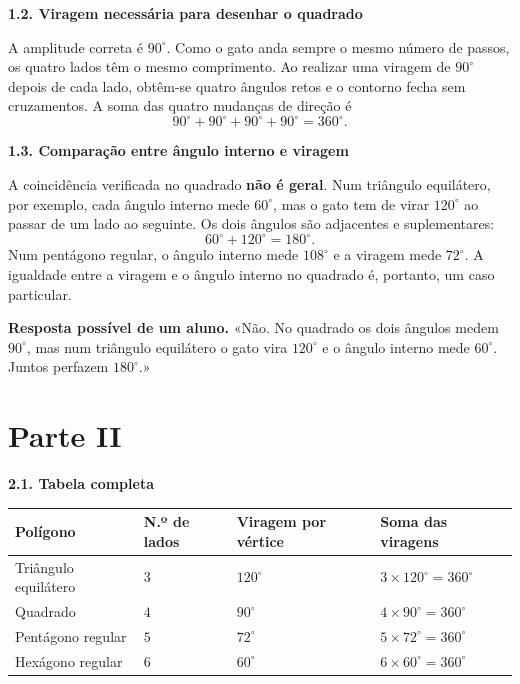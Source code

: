 \noindent\textbf{1.2. Viragem necessária para desenhar o quadrado}

A amplitude correta é $\boxed{90^\circ}$. Como o gato anda sempre
o mesmo número de passos, os quatro lados têm o mesmo comprimento.
Ao realizar uma viragem de $90^\circ$ depois de cada lado, obtêm-se
quatro ângulos retos e o contorno fecha sem cruzamentos. A soma das
quatro mudanças de direção é
\[
90^\circ+90^\circ+90^\circ+90^\circ=360^\circ.
\]

\noindent\textbf{1.3. Comparação entre ângulo interno e viragem}

A coincidência verificada no quadrado \textbf{não é geral}. Num
triângulo equilátero, por exemplo, cada ângulo interno mede $60^\circ$,
mas o gato tem de virar $120^\circ$ ao passar de um lado ao seguinte.
Os dois ângulos são adjacentes e suplementares:
\[
60^\circ+120^\circ=180^\circ.
\]
Num pentágono regular, o ângulo interno mede $108^\circ$ e a
viragem mede $72^\circ$. A igualdade entre a viragem e o ângulo
interno no quadrado é, portanto, um caso particular.

\begin{nota}
\textbf{Resposta possível de um aluno.} «Não. No quadrado os dois
ângulos medem $90^\circ$, mas num triângulo equilátero o gato vira
$120^\circ$ e o ângulo interno mede $60^\circ$. Juntos perfazem
$180^\circ$.»
\end{nota}

\section*{Parte II}

\noindent\textbf{2.1. Tabela completa}

\begin{center}
\renewcommand{\arraystretch}{1.32}
\begin{tabularx}{\linewidth}{|>{\raggedright\arraybackslash}X|
>{\centering\arraybackslash}p{1.5cm}|
>{\centering\arraybackslash}p{2.6cm}|
>{\centering\arraybackslash}p{2.65cm}|}
\hline
\rowcolor{azulClaro}
\textbf{Polígono} & \textbf{N.º de lados} &
\textbf{Viragem por vértice} & \textbf{Soma das viragens}\\\hline
Triângulo equilátero & $3$ & $120^\circ$ & $3\times120^\circ=360^\circ$\\\hline
Quadrado & $4$ & $90^\circ$ & $4\times90^\circ=360^\circ$\\\hline
Pentágono regular & $5$ & $72^\circ$ & $5\times72^\circ=360^\circ$\\\hline
Hexágono regular & $6$ & $60^\circ$ & $6\times60^\circ=360^\circ$\\\hline
\end{tabularx}
\end{center}

